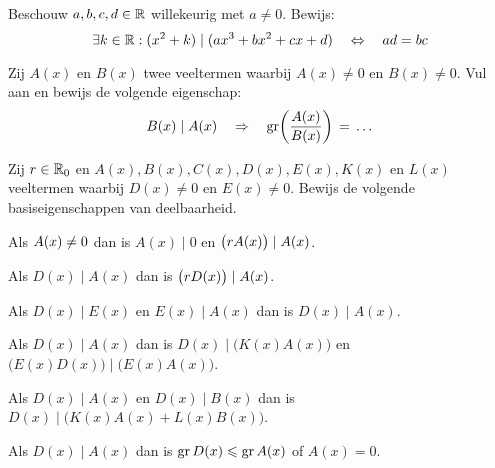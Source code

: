 \documentclass{ximera}
\begin{document}
	\author{Koen De Naeghel - Wiskunde Op Maat}
    \xmsource
	\label{xim:veeltermen_deling_door_veelterm_oefeningen_reeks3}



\begin{exercise}
Beschouw \(a,b,c,d \in \mathbb{R}\) willekeurig met \(a \neq 0\). Bewijs:
\[
\exists k \in \mathbb{R}: (x^2 + k) \mid (ax^3 + bx^2 + cx + d) \quad \Leftrightarrow \quad ad = bc
\]
\end{exercise}

\begin{exercise} 
Zij \(A(x)\) en \(B(x)\) twee veeltermen waarbij \(A(x) \neq 0\) en \(B(x) \neq 0\). Vul aan en bewijs de volgende eigenschap:
\[
B(x) \mid A(x) \quad \Rightarrow \quad \operatorname{gr}\biggl(\frac{A(x)}{B(x)}\biggr) 
\, = \, \ldots
\]
\end{exercise}

\begin{exercise}
Zij \(r \in \mathbb{R}_0\) en \(A(x), B(x), C(x), D(x), E(x), K(x)\) en \(L(x)\) veeltermen waarbij \(D(x) \neq 0\) en \(E(x) \neq 0\). Bewijs de volgende basiseigenschappen van deelbaarheid. 


	\begin{question} Als \(\displaystyle A(x)  \neq 0\) dan is \(A(x) \mid 0\) en \(\displaystyle \bigl(rA(x)\bigr) \mid A(x)\).                                   \end{question}
	\begin{question} Als \(D(x) \mid A(x)\) dan is \(\displaystyle \bigl(rD(x)\bigr) \mid A(x)\).                                                     \end{question}
	\begin{question} Als \(D(x) \mid E(x)\) en \(E(x) \mid A(x)\) dan is \(D(x) \mid A(x)\).                                                 \end{question}
	\begin{question} Als \(D(x) \mid A(x)\) dan is \(D(x) \mid \bigl(K(x)A(x)\bigr)\) en \(\bigl(E(x)D(x)\bigr) \mid \bigl(E(x)A(x)\bigr)\). \end{question}
	\begin{question} Als \(D(x) \mid A(x)\) en \(D(x) \mid B(x)\) dan is \(D(x) \mid \bigl(K(x)A(x)+L(x)B(x)\bigr)\).                        \end{question}
	\begin{question} Als \(D(x) \mid A(x)\) dan is \(\operatorname{gr} D(x) \leqslant \operatorname{gr} A(x)\) of \(A(x) = 0\).                                               \end{question}
	
\end{exercise}
\end{document}
